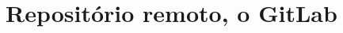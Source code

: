 \documentclass[12pt,openright,oneside,a4paper,english,brazil]{abntex2}
\begin{document}
\chapter{Repositório remoto, o GitLab}



%
%
	 		
\end{document}
